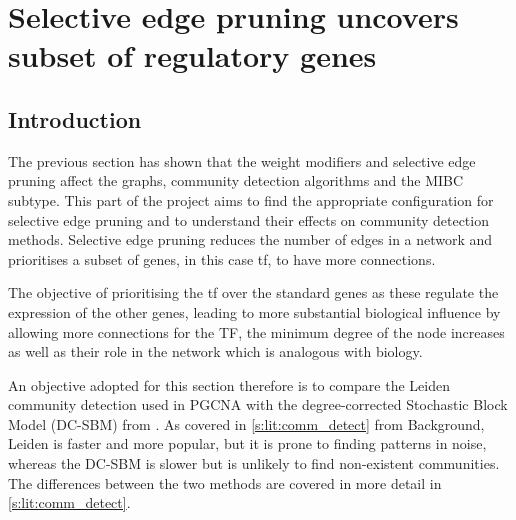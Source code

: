 \chapter{Selective edge pruning uncovers subset of regulatory genes} \label{s:N_I:sel_pruning}
\vspace{3mm}
\vspace{3mm}

\section{Introduction}

The previous section has shown that the weight modifiers and selective edge pruning affect the graphs, community detection algorithms and the MIBC subtype. This part of the project aims to find the appropriate configuration for selective edge pruning and to understand their effects on community detection methods. Selective edge pruning reduces the number of edges in a network and prioritises a subset of genes, in this case \acrfull{tf}, to have more connections.

The objective of prioritising the \acrshort{tf} over the standard genes as these regulate the expression of the other genes, leading to more substantial biological influence by allowing more connections for the TF, the minimum degree of the node increases as well as their role in the network which is analogous with biology. 

An objective adopted for this section therefore is to compare the Leiden \citep{Traag2019-ne} community detection used in PGCNA with the degree-corrected Stochastic Block Model (DC-SBM) from \citep{Karrer2011-si, Peixoto2017-gc}. As covered in \cref{s:lit:comm_detect} from Background, Leiden is faster and more popular, but it is prone to finding patterns in noise, whereas the DC-SBM is slower but is unlikely to find non-existent communities. The differences between the two methods are covered in more detail in \cref{s:lit:comm_detect}.


